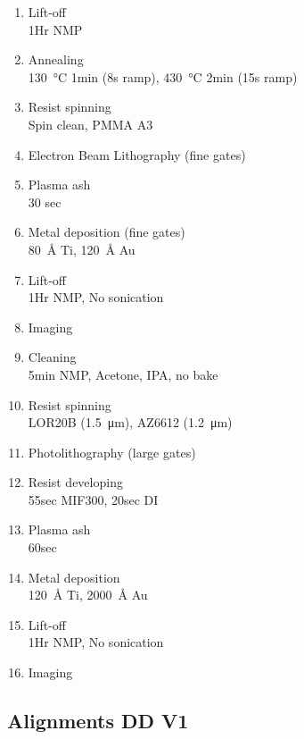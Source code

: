 \begin{enumerate}[noitemsep]
\item Lift-off\\
    {\tiny 1Hr NMP}
\item Annealing\\
    {\tiny \SI{130}{\celsius} 1min (8s ramp), \SI{430}{\celsius} 2min (15s ramp)}
\item Resist spinning\\
    {\tiny Spin clean, PMMA A3}
\item Electron Beam Lithography (fine gates)
\item Plasma ash\\
    {\tiny 30 sec}
\item Metal deposition (fine gates)\\
    {\tiny \SI{80}{\angstrom} Ti, \SI{120}{\angstrom} Au}
\item Lift-off\\
    {\tiny 1Hr NMP, No sonication}
\item Imaging
\item Cleaning\\
    {\tiny 5min NMP, Acetone, IPA, no bake}
\item Resist spinning\\
    {\tiny LOR20B (\SI{1.5}{\micro\meter}), AZ6612 (\SI{1.2}{\micro\meter})}
\item Photolithography (large gates)
\item Resist developing\\
    {\tiny 55sec MIF300, 20sec DI }
\item Plasma ash\\
    {\tiny 60sec}
\item Metal deposition\\
    {\tiny \SI{120}{\angstrom} Ti, \SI{2000}{\angstrom} Au}
\item Lift-off\\
    {\tiny 1Hr NMP, No sonication}
\item Imaging
\end{enumerate}

\newpage

\subsection{Alignments DD V1}


